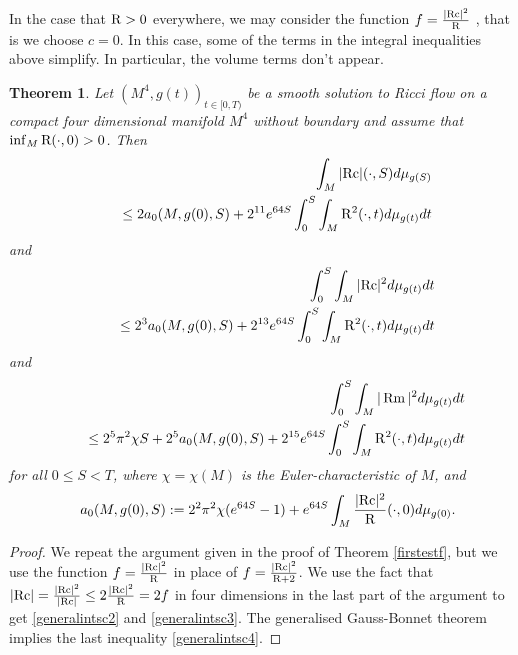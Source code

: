 \documentclass{amsart}
\numberwithin{equation}{section}
\newtheorem{theo}{Theorem}[section]
\theoremstyle{definition}
\theoremstyle{remark}
\begin{document}
In the case that ${{\rm R}}>0$ everywhere, we may consider the function
$f = \frac{|{{\rm{Rc}}}|^2}{{\rm R}}$ , that is we choose $c=0$. In this case,
some of the terms in the integral inequalities above simplify. In
particular, the volume terms don't appear.

\begin{theo}\label{posscalar}
Let $(M^4,g(t))_{t\in [0,T)}$ be a smooth solution to Ricci flow  on a
compact four dimensional manifold $M^4$ without boundary and assume that $\inf_M
{{\rm R}}(\cdot,0) > 0$.  Then
\begin{eqnarray}
 &&\int_M |{{\rm{Rc}}}|(\cdot,S) d\mu_{g(S)} \cr
&& \ \ \ \ \leq  2a_0(M,g(0),S)  + 2^{11}  e^{64S}\int_0^S \int_M {{\rm R}}^2(\cdot,t) d\mu_{g(t)} dt
 \label{generalintsc2}
\end{eqnarray}
and
\begin{eqnarray}
&&\int_0^S \int_M |{{\rm{Rc}}}|^2  d\mu_{g(t)} dt \cr
&&\ \ \ \ \leq 2^3a_0(M,g(0),S) 
+ 2^{13} e^{64S}\int_0^S \int_M {{\rm R}}^2(\cdot,t) d\mu_{g(t)} dt
 \label{generalintsc3}
\end{eqnarray}
and
\begin{eqnarray}
&&\int_0^S \int_M |\operatorname{Rm}|^2  d\mu_{g(t)} dt \cr 
&& \ \ \ \ 
\leq 2^5 \pi^2 \chi S + 2^5a_0(M,g(0),S)  + 2^{15}e^{64S}\int_0^S \int_M {{\rm R}}^2(\cdot,t) d\mu_{g(t)} dt
 \label{generalintsc4} 
\end{eqnarray}
for all $0\leq S <T$, where $\chi = \chi(M)$ is the
Euler-characteristic of $M$, and 
\begin{eqnarray}
&& a_0(M,g(0),S):= 2^2\pi^2 \chi(e^{64S} - 1) + e^{64S}\int_M
\frac{|{{\rm{Rc}}}|^2}{{\rm R}}(\cdot,0) d\mu_{g(0)}.
\end{eqnarray}
\end{theo}

\begin{proof}
We repeat the argument given in the proof of Theorem \ref{firstestf}, but
we use the function $f = \frac{|{{\rm{Rc}}}|^2}{{\rm R}}$ in place of
$f = \frac{|{{\rm{Rc}}}|^2}{{{\rm R}} + 2}$.
We use the fact that  $  |{{\rm{Rc}}}| = \frac{|{{\rm{Rc}}}|^2 }{|{{\rm{Rc}}}|} \leq
2\frac{|{{\rm{Rc}}}|^2}{{\rm R}} = 2f$ in four dimensions in the last part of the
argument to get
\eqref{generalintsc2} and \eqref{generalintsc3}.
The generalised Gauss-Bonnet theorem implies the last inequality \eqref{generalintsc4}.
\end{proof}
\end{document}
